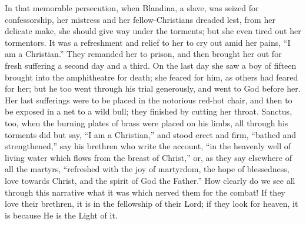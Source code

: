 In that memorable persecution, when Blandina, a slave, was seized
for confessorship, her mistress and her fellow-Christians dreaded
lest, from her delicate make, she should give way under the torments;
but she even tired out her tormentors. It was a refreshment and
relief to her to cry out amid her pains, ``I am a Christian.''
They remanded her to prison, and then brought her out for fresh
suffering a second day and a third. On the last day she saw a boy of
fifteen brought into the amphitheatre for death; she feared for him,
as others had feared for her; but he too went through his trial
generously, and went to God before her. Her last sufferings were to be
placed in the notorious red-hot chair, and then to be exposed in a net
to a wild bull; they finished by cutting her throat. Sanctus, too,
when the burning plates of brass were placed on his limbs, all through
his torments did but say, ``I am a Christian,'' and stood
erect and firm, ``bathed and strengthened,'' say his brethren
who write the account, ``in the heavenly well of living water
which flows from the breast of Christ,'' or, as they say elsewhere
of all the martyrs, ``refreshed with the joy of martyrdom, the
hope of blessedness, love towards Christ, and the spirit of God the
Father.'' How clearly do we see all through this narrative what it
was which nerved them for the combat! If they love their brethren, it
is in the fellowship of their Lord; if they look for heaven, it is
because He is the Light of it.

